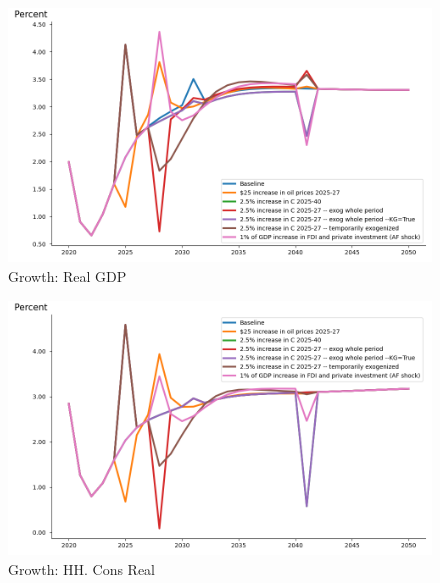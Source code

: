 \documentclass{article}
\begin{document}
 
\begin{figure}[htbp]
\centering
\includegraphics[width=\textwidth]{"../My first plot/Real GDP, growth.png"}
\caption{Growth: Real GDP}
\end{figure} 
 
\begin{figure}[htbp]
\centering
\includegraphics[width=\textwidth]{"../My first plot/HH. Cons Real, growth.png"}
\caption{Growth: HH. Cons Real}
\end{figure} 
\end{document}
